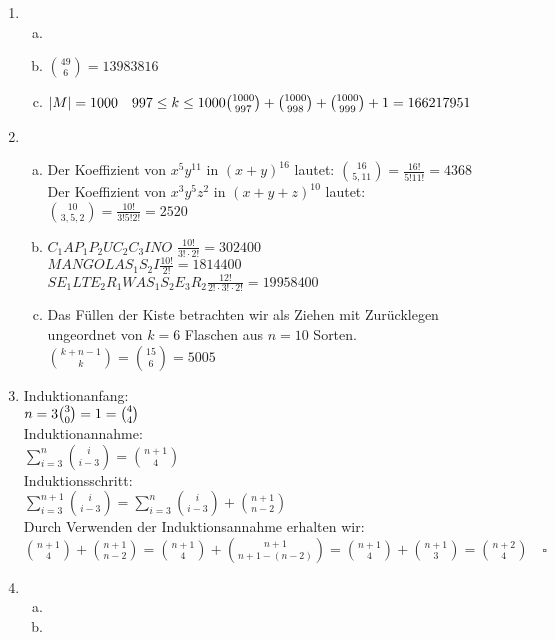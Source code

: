 \documentclass[a4paper]{scrartcl}
\title{\titleinfo}
\author{Elena Noll, Sven-Hendrik Haase, Arne Feil}
\date{\today}
\newcommand{\qed}{\quad \square}
\begin{document}
\maketitle
\begin{enumerate}[1.]
\item
\begin{enumerate}[a)]
\item
\item
${49 \choose 6}=13 983 816$
\item
$|M|=1000 \quad  997 \leq k \leq 1000 \\
{1000 \choose 997}+{1000 \choose 998}+{1000 \choose 999}+1=166 217 951$
\end{enumerate}
\item
\begin{enumerate}[a)]
\item
Der Koeffizient von $x^5y^{11}$ in $(x+y)^{16}$ lautet: ${16 \choose 5,11}= 
\frac{16!}{5!11!}=4368$ \\
Der Koeffizient von $x^3y^5z^2$ in $(x+y+z)^{10}$ lautet: ${10 \choose 3,5,2}= 
\frac{10!}{3!5!2!}=2520$
\item
$C_1 A P_1 P_2 U C_2 C_3 I N O$
$\frac{10!}{3!\cdot 2!}=302400$\\
$MANGOLAS_1S_2I
\frac{10!}{2!}=1 814 400$\\
$SE_1LTE_2R_1WAS_1S_2E_3R_2
\frac{12!}{2!\cdot 3!\cdot 2!}=19 958 400$
\item
Das Füllen der Kiste betrachten wir als Ziehen mit Zurücklegen ungeordnet von 
$k=6$ Flaschen aus $n=10$ Sorten.\\
${k+n-1 \choose k}={15 \choose 6}=5005$
\end{enumerate}
\item
Induktionanfang:\\
$n=3\\
{3 \choose 0}=1={4 \choose 4}$\\
Induktionannahme:\\
$\displaystyle \sum_{i=3}^{n}{i \choose i-3}={n+1 \choose 4}$\\
Induktionsschritt:\\
$\displaystyle \sum_{i=3}^{n+1}{i \choose i-3}=\sum_{i=3}^{n}{i \choose i-3}+{n+1 \choose n-2}$\\
Durch Verwenden der Induktionsannahme erhalten wir:\\
$\displaystyle {n+1 \choose 4}+{n+1 \choose n-2}={n+1 \choose 4}+{n+1 \choose 
n+1-(n-2)}={n+1 \choose 4}+{n+1 \choose 3}={n+2 \choose 4} \qed$
\item
\begin{enumerate}[a)]
\item

\item
\end{enumerate}
\end{enumerate}
\end{document}
